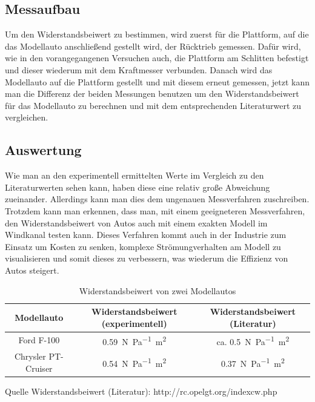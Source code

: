 \subsection{Messaufbau}

Um den Widerstandsbeiwert zu bestimmen, wird zuerst für die Plattform, auf die das Modellauto anschließend gestellt wird, der Rücktrieb gemessen. Dafür wird, wie in den vorangegangenen Versuchen auch, die Plattform am Schlitten befestigt und dieser wiederum mit dem Kraftmesser verbunden. Danach wird das Modellauto auf die Plattform gestellt und mit diesem erneut gemessen, jetzt kann man die Differenz der beiden Messungen benutzen um den Widerstandsbeiwert für das Modellauto zu berechnen und mit dem entsprechenden Literaturwert zu vergleichen.

\subsection{Auswertung}

Wie man an den experimentell ermittelten Werte im Vergleich zu den Literaturwerten sehen kann, haben diese eine relativ große Abweichung zueinander. Allerdings kann man dies dem ungenauen Messverfahren zuschreiben. Trotzdem kann man erkennen, dass man, mit einem geeigneteren Messverfahren, den Widerstandsbeiwert von Autos auch mit einem exakten Modell im Windkanal testen kann. Dieses Verfahren kommt auch in der Industrie zum Einsatz um Kosten zu senken, komplexe Strömungverhalten am Modell zu visualisieren und somit dieses zu verbessern, was wiederum die Effizienz von Autos steigert.

\begin{table}[]
    \caption{Widerstandsbeiwert von zwei Modellautos}
    \centering
    \begin{tabular}{c c c}
    \hline
    Modellauto  &   Widerstandsbeiwert (experimentell)  &   Widerstandsbeiwert (Literatur)  \\
    \hline
    Ford F-100     &    \SI{0.59}{\newton\per\pascal\square\metre}  & ca. \SI{0.5}{\newton\per\pascal\square\metre} \\[5pt]
    Chrysler PT-Cruiser & \SI{0.54}{\newton\per\pascal\square\metre}    &   \SI{0.37}{\newton\per\pascal\square\metre} \\[5pt]
    \hline
    \end{tabular}
    Quelle Widerstandsbeiwert (Literatur): http://rc.opelgt.org/indexcw.php
    \label{tab:my_label}
\end{table}